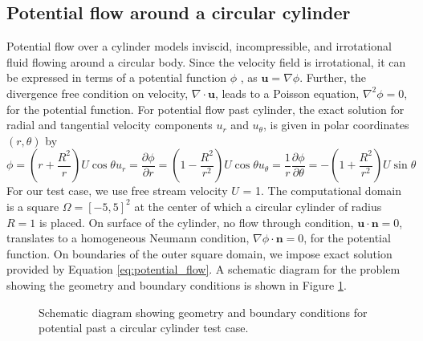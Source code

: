 \documentclass[final,3p,review]{elsarticle}
\begin{document}
	\subsection{Potential flow around a circular cylinder}
	\noindent Potential flow over a cylinder models inviscid, incompressible, and irrotational fluid flowing around a circular body. Since the velocity field is irrotational, it can be expressed in terms of a potential function $\phi$ \cite{thomas2015thomas}, as  $\mathbf{u} = \nabla \phi$. Further, the divergence free condition on velocity, $\nabla \cdot \mathbf{u}$, leads to a Poisson equation, $\nabla^2 \phi = 0$, for the potential function. For potential flow past cylinder, the exact solution for radial and tangential velocity components $u_r$ and $u_{\theta}$, is given in polar coordinates $(r,\theta)$ by
	\begin{subequations}
		\begin{equation}
		\phi = \left(r + \frac{R^2}{r}\right)U\cos \theta
		\end{equation}
		\begin{equation}
			u_r  = \frac{\partial \phi}{\partial r} =  \left(1 - \frac{R^2}{r^2}\right)U\cos \theta
		\end{equation}
		\begin{equation}
			u_{\theta}  = \frac{1}{r}\frac{\partial \phi}{\partial \theta} =  -\left(1 + \frac{R^2}{r^2}\right)U\sin \theta
		\end{equation}
		\label{eq:potential_flow}
	\end{subequations}
  	For our test case, we use free stream velocity $U$ = 1. The computational domain is a square $\Omega = [-5,5]^2$ at the center of which  a circular cylinder of radius $R = 1$ is placed. On surface of the cylinder, no flow through condition, $\mathbf{u} \cdot \mathbf{n} = 0$, translates to a homogeneous Neumann condition, $\nabla \phi \cdot \mathbf{n} = 0$, for the potential function. On boundaries of the outer square domain, we impose exact solution provided by Equation \ref{eq:potential_flow}. A schematic diagram for the problem showing the geometry and boundary conditions is shown in Figure \ref{fig:potential-flow-schematic}.
  	\begin{figure}[h]
  		\centering
  		\caption{Schematic diagram showing geometry and boundary conditions for potential past a circular cylinder test case.}
  		\label{fig:potential-flow-schematic}
  	\end{figure}
  	
\end{document}
